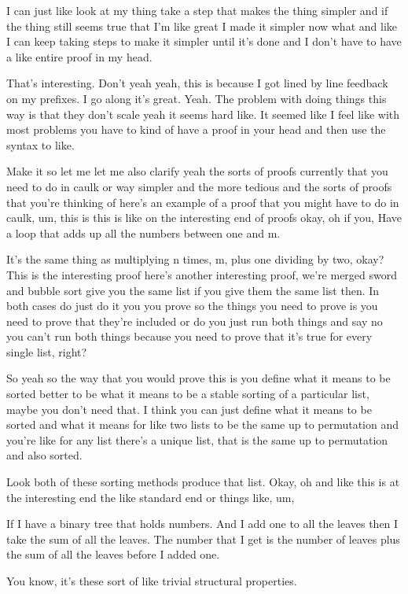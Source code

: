 \begin{subappendices}
I can just like look at my thing take a step that makes the thing simpler and if the thing still seems true that I'm like great I made it simpler now what and like I can keep taking steps to make it simpler until it's done and I don't have to have a like entire proof in my head.

That's interesting. Don't yeah yeah, this is because I got lined by line feedback on my prefixes. I go along it's great. Yeah. The problem with doing things this way is that they don't scale yeah it seems hard like. It seemed like I feel like with most problems you have to kind of have a proof in your head and then use the syntax to like.

Make it so let me let me also clarify yeah the sorts of proofs currently that you need to do in caulk or way simpler and the more tedious and the sorts of proofs that you're thinking of here's an example of a proof that you might have to do in caulk, um, this is this is like on the interesting end of proofs okay, oh if you, Have a loop that adds up all the numbers between one and m.

It's the same thing as multiplying n times, m, plus one dividing by two, okay? This is the interesting proof here's another interesting proof, we're merged sword and bubble sort give you the same list if you give them the same list then. In both cases do just do it you you prove so the things you need to prove is you need to prove that they're included or do you just run both things and say no you can't run both things because you need to prove that it's true for every single list, right?

So yeah so the way that you would prove this is you define what it means to be sorted better to be what it means to be a stable sorting of a particular list, maybe you don't need that. I think you can just define what it means to be sorted and what it means for like two lists to be the same up to permutation and you're like for any list there's a unique list, that is the same up to permutation and also sorted.

Look both of these sorting methods produce that list. Okay, oh and like this is at the interesting end the like standard end or things like, um,

If I have a binary tree that holds numbers. And I add one to all the leaves then I take the sum of all the leaves. The number that I get is the number of leaves plus the sum of all the leaves before I added one.

You know, it's these sort of like trivial structural properties.


\end{subappendices}
